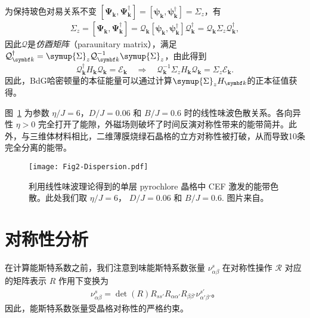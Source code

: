         为保持玻色对易关系不变 $[\bm{\Psi}^{}_{{\bm{k}}},\bm{\Psi}^\dagger_{{\bm{k}}}]=[\bm{\psi}^{}_{{\bm{k}}},\bm{\psi}^\dagger_{{\bm{k}}}]=\Sigma_z$，有
        \begin{align}
            \Sigma_z=[\bm{\Psi}^{}_{{\bm{k}}},\bm{\Psi}^\dagger_{{\bm{k}}}]=\mathcal{Q}^{}_{{\bm{k}}}[\bm{\psi}^{}_{{\bm{k}}},\bm{\psi}^\dagger_{{\bm{k}}}] \mathcal{Q}^\dagger_{{\bm{k}}} = \mathcal{Q}_{{\bm{k}}} \Sigma_z \mathcal{Q}^\dagger_{{\bm{k}}},
            \label{eq:Normalize_Q}
        \end{align}
        因此$\mathcal{Q}$是\emph{仿酉矩阵}（paraunitary matrix），满足$\mathcal{Q}_{{\bm{k}}}^\dagger = \symup{\Sigma}_z \mathcal{Q}_{{\bm{k}}}^{-1}\symup{\Sigma}_z$，由此得到
        \begin{equation}
            \mathcal{Q}^\dagger_{{\bm{k}}} H_{{\bm{k}}} \mathcal{Q}^{}_{{\bm{k}}} = \mathcal{E}_{{\bm{k}}} \quad
            \Rightarrow \quad \mathcal{Q}^{-1}_{{\bm{k}}} \Sigma_z H_{{\bm{k}}}\mathcal{Q}_{{\bm{k}}}= \Sigma_z \mathcal{E}_{{\bm{k}}}.
        \end{equation}
        因此，BdG哈密顿量的本征能量可以通过计算$\symup{\Sigma}_z H_{{\bm{k}}}$的正本征值获得。
        
        
        图~\ref{fig:dis_pyro} 为参数 $\eta/J = 6$，$D/J=0.06$ 和 $B/J=0.6$ 时的线性味波色散关系。各向异性 $\eta>0$ 完全打开了能隙，外磁场则破坏了时间反演对称性带来的能带简并。此外，与三维体材料相比，二维薄膜烧绿石晶格的立方对称性被打破，从而导致10条完全分离的能带。
        \begin{figure}[!h]
            \centering
            \texttt{[image: Fig2-Dispersion.pdf]}
            \caption{利用线性味波理论得到的单层 pyrochlore 晶格中 CEF 激发的能带色散。此处我们取 $\eta/J = 6$， $D/J=0.06$ 和 $B/J=0.6$. 图片来自\cite{lu2024Spin}。}
            \label{fig:dis_pyro}
        \end{figure}

    \section{对称性分析}
        在计算能斯特系数之前，我们注意到味能斯特系数张量 $\nu^s_{\alpha\beta}$ 在对称性操作 $\mathcal{R}$ 对应的矩阵表示 $R$ 作用下变换为~\cite{suzuki2017cluster,mook2019thermal,li2020intrinsic}
        \begin{align}
        \nu^s_{\alpha\beta} = \det(R) R_{s s'}R_{\alpha\alpha'}R_{\beta\beta'} \nu^{s'}_{\alpha'\beta'}。
        \end{align}
        因此，能斯特系数张量受晶格对称性的严格约束。
        
